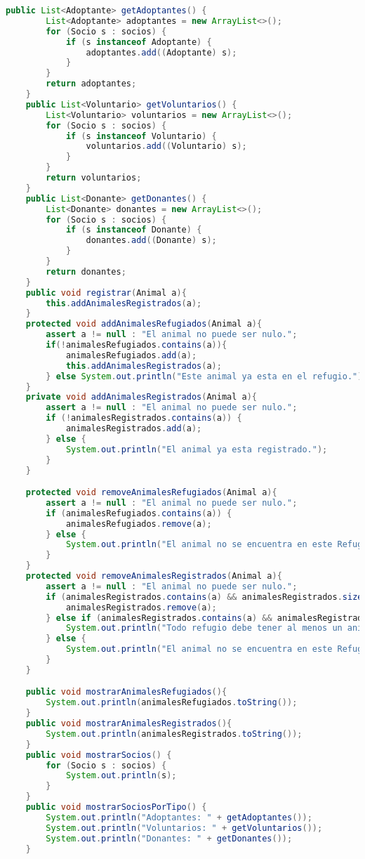 \begin{lstlisting}[style = javaNormal, language=Java]
    public List<Adoptante> getAdoptantes() {
        List<Adoptante> adoptantes = new ArrayList<>();
        for (Socio s : socios) {
            if (s instanceof Adoptante) {
                adoptantes.add((Adoptante) s);
            }
        }
        return adoptantes;
    }
    public List<Voluntario> getVoluntarios() {
        List<Voluntario> voluntarios = new ArrayList<>();
        for (Socio s : socios) {
            if (s instanceof Voluntario) {
                voluntarios.add((Voluntario) s);
            }
        }
        return voluntarios;
    }
    public List<Donante> getDonantes() {
        List<Donante> donantes = new ArrayList<>();
        for (Socio s : socios) {
            if (s instanceof Donante) {
                donantes.add((Donante) s);
            }
        }
        return donantes;
    }
    public void registrar(Animal a){
        this.addAnimalesRegistrados(a);
    }
    protected void addAnimalesRefugiados(Animal a){
        assert a != null : "El animal no puede ser nulo.";
        if(!animalesRefugiados.contains(a)){
            animalesRefugiados.add(a);
            this.addAnimalesRegistrados(a);
        } else System.out.println("Este animal ya esta en el refugio.");
    }
    private void addAnimalesRegistrados(Animal a){
        assert a != null : "El animal no puede ser nulo.";
        if (!animalesRegistrados.contains(a)) {
            animalesRegistrados.add(a);
        } else {
            System.out.println("El animal ya esta registrado.");
        }
    }

    protected void removeAnimalesRefugiados(Animal a){
        assert a != null : "El animal no puede ser nulo.";
        if (animalesRefugiados.contains(a)) {
            animalesRefugiados.remove(a);
        } else {
            System.out.println("El animal no se encuentra en este Refugio.");
        }
    }
    protected void removeAnimalesRegistrados(Animal a){
        assert a != null : "El animal no puede ser nulo.";
        if (animalesRegistrados.contains(a) && animalesRegistrados.size() > 1) {
            animalesRegistrados.remove(a);
        } else if (animalesRegistrados.contains(a) && animalesRegistrados.size() == 1) {
            System.out.println("Todo refugio debe tener al menos un animal registrado, estas intentando eliminar el unico animal existente.");
        } else {
            System.out.println("El animal no se encuentra en este Refugio.");
        }
    }

    public void mostrarAnimalesRefugiados(){
        System.out.println(animalesRefugiados.toString());
    }
    public void mostrarAnimalesRegistrados(){
        System.out.println(animalesRegistrados.toString());
    }
    public void mostrarSocios() {
        for (Socio s : socios) {
            System.out.println(s);
        }
    }
    public void mostrarSociosPorTipo() {
        System.out.println("Adoptantes: " + getAdoptantes());
        System.out.println("Voluntarios: " + getVoluntarios());
        System.out.println("Donantes: " + getDonantes());
    }


\end{lstlisting}
